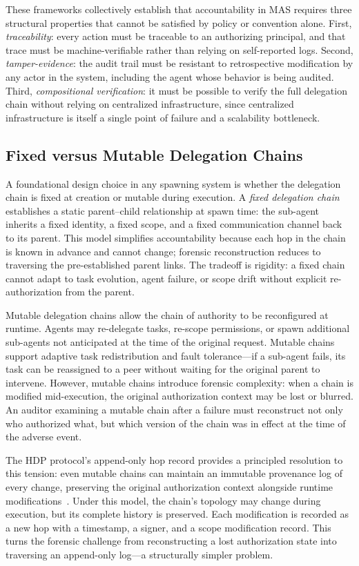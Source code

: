 These frameworks collectively establish that accountability in MAS requires three structural properties that cannot be satisfied by policy or convention alone. First, \emph{traceability}: every action must be traceable to an authorizing principal, and that trace must be machine-verifiable rather than relying on self-reported logs. Second, \emph{tamper-evidence}: the audit trail must be resistant to retrospective modification by any actor in the system, including the agent whose behavior is being audited. Third, \emph{compositional verification}: it must be possible to verify the full delegation chain without relying on centralized infrastructure, since centralized infrastructure is itself a single point of failure and a scalability bottleneck.

\subsection{Fixed versus Mutable Delegation Chains}
\label{sec:delegation}

A foundational design choice in any spawning system is whether the delegation chain is fixed at creation or mutable during execution. A \emph{fixed delegation chain} establishes a static parent--child relationship at spawn time: the sub-agent inherits a fixed identity, a fixed scope, and a fixed communication channel back to its parent. This model simplifies accountability because each hop in the chain is known in advance and cannot change; forensic reconstruction reduces to traversing the pre-established parent links. The tradeoff is rigidity: a fixed chain cannot adapt to task evolution, agent failure, or scope drift without explicit re-authorization from the parent.

Mutable delegation chains allow the chain of authority to be reconfigured at runtime. Agents may re-delegate tasks, re-scope permissions, or spawn additional sub-agents not anticipated at the time of the original request. Mutable chains support adaptive task redistribution and fault tolerance---if a sub-agent fails, its task can be reassigned to a peer without waiting for the original parent to intervene. However, mutable chains introduce forensic complexity: when a chain is modified mid-execution, the original authorization context may be lost or blurred. An auditor examining a mutable chain after a failure must reconstruct not only who authorized what, but which version of the chain was in effect at the time of the adverse event.

The HDP protocol's append-only hop record provides a principled resolution to this tension: even mutable chains can maintain an immutable provenance log of every change, preserving the original authorization context alongside runtime modifications~\cite{hdp2026}. Under this model, the chain's topology may change during execution, but its complete history is preserved. Each modification is recorded as a new hop with a timestamp, a signer, and a scope modification record. This turns the forensic challenge from reconstructing a lost authorization state into traversing an append-only log---a structurally simpler problem.

